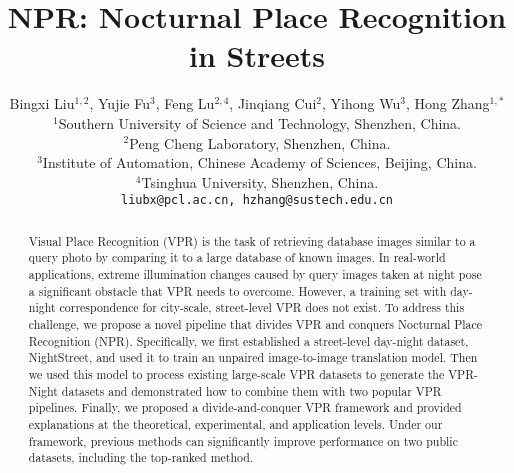 \documentclass[10pt,twocolumn,letterpaper]{article}
\begin{document}
\title{NPR: Nocturnal Place Recognition in Streets}

\author{Bingxi Liu$^{1,2}$, Yujie Fu$^{3}$, Feng Lu$^{2, 4}$, Jinqiang Cui$^{2}$, Yihong Wu$^{3}$, Hong Zhang$^{1,*}$\\
$^{1}$Southern University of Science and Technology, Shenzhen, China.\\
$^{2}$Peng Cheng Laboratory, Shenzhen, China.\\
$^{3}$Institute of Automation, Chinese Academy of Sciences, Beijing, China.\\
$^{4}$Tsinghua University, Shenzhen, China.\\
{\tt\small liubx@pcl.ac.cn, hzhang@sustech.edu.cn}
}
\maketitle
\ificcvfinal\thispagestyle{empty}\fi


\begin{abstract}
Visual Place Recognition (VPR) is the task of retrieving database images similar to a query photo by comparing it to a large database of known images. In real-world applications, extreme illumination changes caused by query images taken at night pose a significant obstacle that VPR needs to overcome. However, a training set with day-night correspondence for city-scale, street-level VPR does not exist. To address this challenge, we propose a novel pipeline that divides VPR and conquers Nocturnal Place Recognition (NPR). Specifically, we first established a street-level day-night dataset, NightStreet, and used it to train an unpaired image-to-image translation model. Then we used this model to process existing large-scale VPR datasets to generate the VPR-Night datasets and demonstrated how to combine them with two popular VPR pipelines. Finally, we proposed a divide-and-conquer VPR framework and provided explanations at the theoretical, experimental, and application levels. Under our framework, previous methods can significantly improve performance on two public datasets, including the top-ranked method.

\end{abstract}
\end{document}

